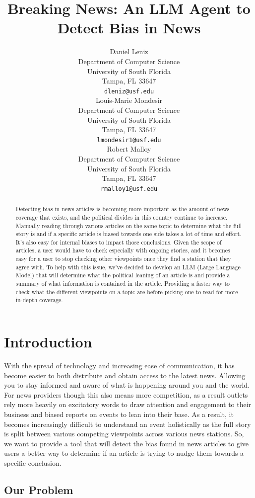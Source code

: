 \documentclass{article}
\title{Breaking News: An LLM Agent to Detect Bias in News}
\author{
  Daniel Leniz\\
  Department of Computer Science\\
  University of South Florida\\
  Tampa, FL 33647 \\
  \texttt{dleniz@usf.edu} \\
  \And
  Louis-Marie Mondesir\\
  Department of Computer Science\\
  University of South Florida\\
  Tampa, FL 33647 \\
  \texttt{lmondesir1@usf.edu} \\
  \And
  Robert Malloy\\
  Department of Computer Science\\
  University of South Florida\\
  Tampa, FL 33647 \\
  \texttt{rmalloy1@usf.edu} \\
}
\begin{document}
\maketitle

\begin{abstract}
Detecting bias in news articles is becoming more important as the amount of news coverage that exists, and the political divides in this country continue to increase. Manually reading through various articles on the same topic to determine what the full story is and if a specific article is biased towards one side takes a lot of time and effort. It’s also easy for internal biases to impact those conclusions. Given the scope of articles, a user would have to check especially with ongoing stories, and it becomes easy for a user to stop checking other viewpoints once they find a station that they agree with. To help with this issue, we’ve decided to develop an LLM (Large Language Model) that will determine what the political leaning of an article is and provide a summary of what information is contained in the article. Providing a faster way to check what the different viewpoints on a topic are before picking one to read for more in-depth coverage.
\end{abstract}

\section{Introduction}

With the spread of technology and increasing ease of communication, it has become easier to both distribute and obtain access to the latest news. Allowing you to stay informed and aware of what is happening around you and the world. For news providers though this also means more competition, as a result outlets rely more heavily on excitatory words to draw attention and engagement to their business and biased reports on events to lean into their base. As a result, it becomes increasingly difficult to understand an event holistically as the full story is split between various competing viewpoints across various news stations. So, we want to provide a tool that will detect the bias found in news articles to give users a better way to determine if an article is trying to nudge them towards a specific conclusion.

\subsection{Our Problem}
\end{document}
